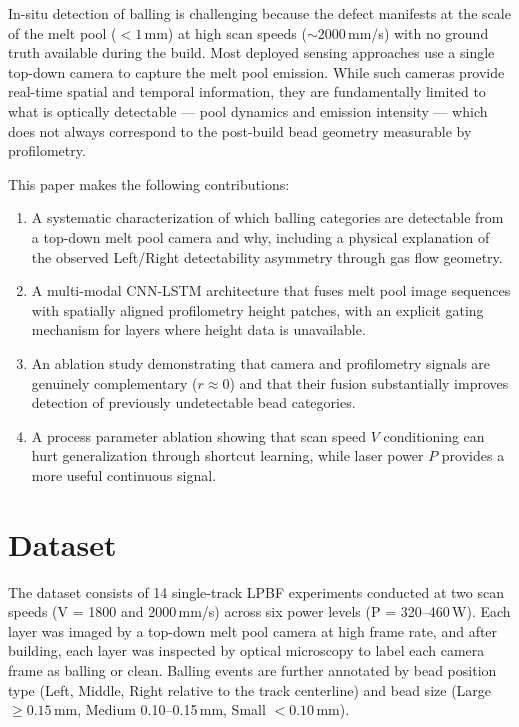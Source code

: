 \documentclass[12pt, letterpaper]{article}
\begin{document}
In-situ detection of balling is challenging because the defect
manifests at the scale of the melt pool ($< 1$\,mm) at high scan
speeds ($\sim 2000$\,mm/s) with no ground truth available during
the build. Most deployed sensing approaches use a single top-down
camera to capture the melt pool emission. While such cameras
provide real-time spatial and temporal information, they are
fundamentally limited to what is optically detectable — pool
dynamics and emission intensity — which does not always correspond
to the post-build bead geometry measurable by profilometry.

This paper makes the following contributions:
\begin{enumerate}
\item A systematic characterization of which balling categories
are detectable from a top-down melt pool camera and why, including
a physical explanation of the observed Left/Right detectability
asymmetry through gas flow geometry.
\item A multi-modal CNN-LSTM architecture that fuses melt pool
image sequences with spatially aligned profilometry height patches,
with an explicit gating mechanism for layers where height data
is unavailable.
\item An ablation study demonstrating that camera and profilometry
signals are genuinely complementary ($r \approx 0$) and that
their fusion substantially improves detection of previously
undetectable bead categories.
\item A process parameter ablation showing that scan speed $V$
conditioning can hurt generalization through shortcut learning,
while laser power $P$ provides a more useful continuous signal.
\end{enumerate}

\section{Dataset}

The dataset consists of 14 single-track LPBF experiments conducted
at two scan speeds (V = 1800 and 2000\,mm/s) across six power
levels (P = 320--460\,W). Each layer was imaged by a top-down
melt pool camera at high frame rate, and after building, each
layer was inspected by optical microscopy to label each camera
frame as balling or clean. Balling events are further annotated
by bead position type (Left, Middle, Right relative to the track
centerline) and bead size (Large $\geq 0.15$\,mm, Medium
0.10--0.15\,mm, Small $< 0.10$\,mm).
\end{document}
